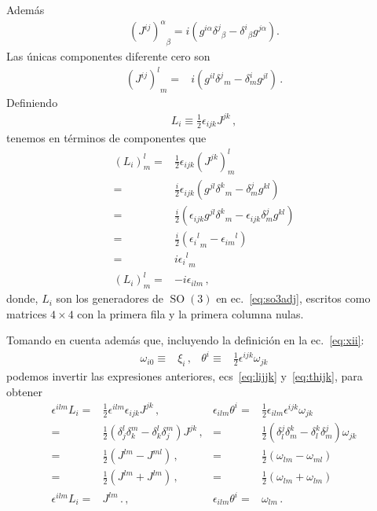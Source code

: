 \begin{frame}
Además
\begin{align}
  {\left(J^{ij}\right)^{\alpha}}_{\beta}=
  i\left(g^{i\alpha}{\delta^j}_\beta-{\delta^i}_\beta g^{j\alpha}\right).
\end{align}
Las únicas componentes diferente cero son
\begin{align}
  {\left(J^{ij}\right)^{l}}_{m}=&i \left( g^{il}{\delta^j}_m -\delta^i_m g^{jl}\right)\,.
\end{align}
Definiendo
\begin{align}
  \label{eq:lijjk}
  L_i\equiv \frac{1}{2}\epsilon_{ijk} J^{jk}\,,
\end{align}
tenemos en términos de componentes que
\begin{align}
  \left( L_i \right)^l_m=&\frac{1}{2} \epsilon_{ijk} \left( J^{jk} \right)^l_m \nonumber\\
             =&\frac{i}{2} \epsilon_{ijk}  \left( g^{jl}{\delta^k}_m -\delta^j_m g^{kl}\right) \nonumber\\
             =&\frac{i}{2}   \left( \epsilon_{ijk} g^{jl}{\delta^k}_m -\epsilon_{ijk}\delta^j_m g^{kl}\right) \nonumber\\
             =&\frac{i}{2}   \left( {{\epsilon_i}^{l}}_{m}-{{\epsilon_{im}}}^{l}\right) \nonumber\\
            =&i {{\epsilon_i}^{l}}_{m} \nonumber\\
   \left( L_i \right)^l_m =&-i \epsilon_{ilm}\,,
\end{align}
donde, $L_i$ son los generadores de $\operatorname{SO}(3)$ en ec.~\eqref{eq:so3adj}, escritos como matrices $4\times 4$ con la primera fila y la primera columna nulas.

Tomando en cuenta además que, incluyendo la definición  en la ec.~\eqref{eq:xii}:
\begin{align}
\label{eq:thijk}
\omega_{i0}\equiv&\xi_i\,,&\theta^i\equiv&\frac{1}{2}\epsilon^{ijk}\omega_{jk}
\end{align}
podemos invertir las expresiones anteriores, ecs~\eqref{eq:lijjk} y~\eqref{eq:thijk}, para obtener
\begin{align}
\epsilon^{ilm}L_i=&\frac{1}{2}\epsilon^{ilm}\epsilon_{ijk}J^{jk}               \,,&\epsilon_{ilm}\theta^i=&\frac{1}{2}\epsilon_{ilm}\epsilon^{ijk}\omega_{jk}         \nonumber\\
  =&\frac{1}{2}\left( \delta_j^l\delta_k^m-\delta_k^l\delta_j^m \right)J^{jk} \,,& =&\frac{1}{2}\left( \delta_l^j\delta_m^k-\delta_l^k\delta_m^j \right)\omega_{jk} \nonumber\\
  =&\frac{1}{2}\left(J^{lm}-J^{ml} \right)                                   \,,& =&\frac{1}{2}\left(\omega_{lm}-\omega_{ml} \right)                         \nonumber\\
  =&\frac{1}{2}\left(J^{lm}+J^{lm} \right)                                   \,,& =&\frac{1}{2}\left(\omega_{lm}+\omega_{lm} \right)                     \nonumber\\
\epsilon^{ilm}L_i=&J^{lm}\,.                                                                \,,&\epsilon_{ilm}\theta^i=&\omega_{lm}\,.
\end{align}


\end{frame}
